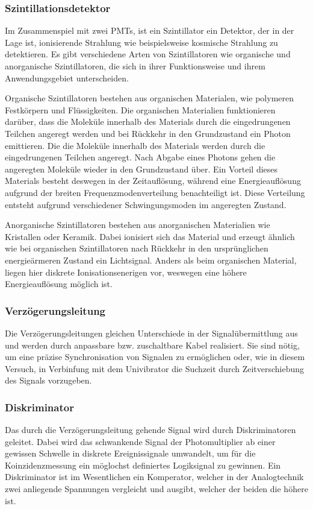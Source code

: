 \subsubsection*{Szintillationsdetektor}
Im Zusammenspiel mit zwei PMTs, ist ein Szintillator ein Detektor, der in der Lage ist, 
ionisierende Strahlung wie beispielsweise kosmische Strahlung zu detektieren. 
Es gibt verschiedene Arten von Szintillatoren wie organische und anorganische Szintillatoren,
die sich in ihrer Funktionsweise und ihrem Anwendungsgebiet unterscheiden.

Organische Szintillatoren bestehen aus organischen Materialen,
wie polymeren Festkörpern und Flüssigkeiten.
Die organischen Materialien funktionieren darüber, 
dass die Moleküle innerhalb des Materials durch die eingedrungenen Teilchen angeregt werden 
und bei Rückkehr in den Grundzustand ein Photon emittieren.
Die die Moleküle innerhalb des Materials werden durch die eingedrungenen Teilchen angeregt. 
Nach Abgabe eines Photons gehen die angeregten Moleküle wieder in den Grundzustand über.
Ein Vorteil dieses Materials besteht deswegen in der Zeitauflösung, 
während eine Energieauflösung aufgrund der breiten Frequenzmodenverteilung benachteiligt ist.
Diese Verteilung entsteht aufgrund verschiedener Schwingungsmoden im angeregten Zustand.

Anorganische Szintillatoren bestehen aus anorganischen Materialien wie Kristallen oder Keramik. 
Dabei ionisiert sich das Material und erzeugt ähnlich wie bei organischen Szintillatoren 
nach Rückkehr in den ursprünglichen energieärmeren Zustand ein Lichtsignal.
Anders als beim organischen Material, liegen hier diskrete Ionisationsenerigen vor,
weswegen eine höhere Energieauflösung möglich ist.

\subsubsection*{Verzögerungsleitung}
Die Verzögerungsleitungen gleichen Unterschiede in der Signalübermittlung aus
und werden durch anpassbare bzw. zuschaltbare Kabel realisiert.
Sie sind nötig, um eine präzise Synchronisation von Signalen zu ermöglichen
oder, wie in diesem Versuch, in Verbinfung mit dem Univibrator die Suchzeit durch Zeitverschiebung des Signals vorzugeben.

\subsubsection*{Diskriminator}
Das durch die Verzögerungsleitung gehende Signal wird durch Diskriminatoren geleitet.
Dabei wird das schwankende Signal der Photomultiplier ab einer gewissen Schwelle in diskrete
Ereignissignale umwandelt, um für die Koinzidenzmessung ein möglochst definiertes Logiksignal zu gewinnen.
Ein Diskriminator ist im Wesentlichen ein Komperator, 
welcher in der Analogtechnik zwei anliegende Spannungen vergleicht und ausgibt,
welcher der beiden die höhere ist. 

